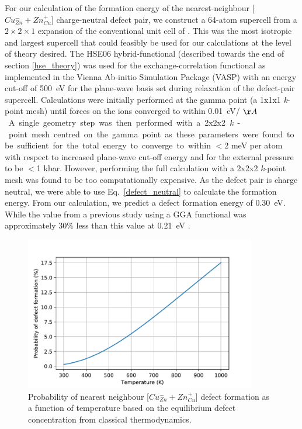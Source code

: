 \documentclass[11pt, twoside]{report}
\begin{document}
For our calculation of the formation energy of the nearest-neighbour [$Cu_{Zn}^- + Zn_{Cu}^+$] charge-neutral defect pair, we construct a 64-atom supercell from a $2\times2\times1$ expansion of the conventional unit cell of {\CZTS}. This was the most isotropic and largest supercell that could feasibly be used for our calculations at the level of theory desired.
The HSE06 hybrid-functional \cite{HSE} (described towards the end of section \ref{hse_theory}) was used for the exchange-correlation functional as implemented in the Vienna Ab-initio Simulation Package (VASP) \cite{VASP} with an energy cut-off of \SI{500}{eV} for the plane-wave basis set during relaxation of the defect-pair supercell. Calculations were initially performed at the gamma point (a 1x1x1 \textit{k}-point mesh) until forces on the ions converged to within \SI{0.01}{eV/ $\AA$}. 
A single geometry step was then performed with a 2x2x2 \textit{k}-point mesh centred on the gamma point as these parameters were found to be sufficient for the total energy to converge to within $<$2 meV per atom with respect to increased plane-wave cut-off energy and for the external pressure to be $<$1 kbar. However, performing the full calculation with a 2x2x2 \textit{k}-point mesh was found to be too computationally expensive. 
As the defect pair is charge neutral, we were able to use Eq.~\ref{defect_neutral} to calculate the formation energy. From our calculation, we predict a defect formation energy of \SI{0.30}{eV}. While the value from a previous study using a GGA functional was approximately 30\% less than this value at \SI{0.21}{eV} \cite{defects_Chen}.

\begin{figure}[h!]
  \centering
    \includegraphics[width=0.9\textwidth]{figures/CZTS_Cu-Zn_defect_conc.pdf}
    \caption{Probability of nearest neighbour [$Cu_{Zn}^- + Zn_{Cu}^+$] defect formation as a function of temperature based on the equilibrium defect concentration from classical thermodynamics.}
  \label{Cu-Zn_eqm_conc}
\end{figure}
\end{document}
